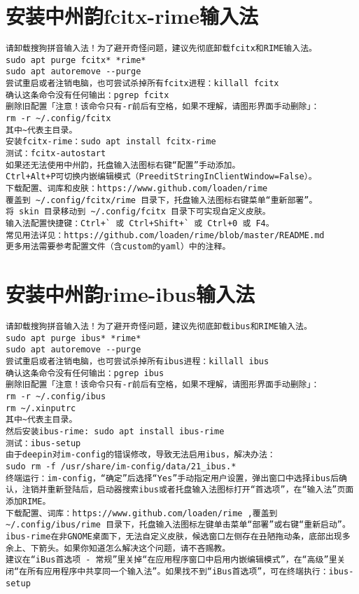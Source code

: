 \documentclass[a4paper,fontset=fandol,zihao=-4,linespread=1.2]{ctexbook}
\begin{document}
\section{安装中州韵fcitx-rime输入法}
\begin{lstlisting}
请卸载搜狗拼音输入法！为了避开奇怪问题，建议先彻底卸载fcitx和RIME输入法。
sudo apt purge fcitx* *rime*
sudo apt autoremove --purge
尝试重启或者注销电脑，也可尝试杀掉所有fcitx进程：killall fcitx
确认这条命令没有任何输出：pgrep fcitx
删除旧配置「注意！该命令只有-r前后有空格，如果不理解，请图形界面手动删除」：
rm -r ~/.config/fcitx
其中~代表主目录。
安装fcitx-rime：sudo apt install fcitx-rime
测试：fcitx-autostart
如果还无法使用中州韵，托盘输入法图标右键“配置”手动添加。
Ctrl+Alt+P可切换内嵌编辑模式（PreeditStringInClientWindow=False）。
下载配置、词库和皮肤：https://www.github.com/loaden/rime
覆盖到 ~/.config/fcitx/rime 目录下，托盘输入法图标右键菜单“重新部署”。
将 skin 目录移动到 ~/.config/fcitx 目录下可实现自定义皮肤。
输入法配置快捷键：Ctrl+` 或 Ctrl+Shift+` 或 Ctrl+0 或 F4。
常见用法详见：https://github.com/loaden/rime/blob/master/README.md
更多用法需要参考配置文件（含custom的yaml）中的注释。
\end{lstlisting}

\section{安装中州韵rime-ibus输入法}
\begin{lstlisting}
请卸载搜狗拼音输入法！为了避开奇怪问题，建议先彻底卸载ibus和RIME输入法。
sudo apt purge ibus* *rime*
sudo apt autoremove --purge
尝试重启或者注销电脑，也可尝试杀掉所有ibus进程：killall ibus
确认这条命令没有任何输出：pgrep ibus
删除旧配置「注意！该命令只有-r前后有空格，如果不理解，请图形界面手动删除」：
rm -r ~/.config/ibus
rm ~/.xinputrc
其中~代表主目录。
然后安装ibus-rime: sudo apt install ibus-rime
测试：ibus-setup
由于deepin对im-config的错误修改，导致无法启用ibus，解决办法：
sudo rm -f /usr/share/im-config/data/21_ibus.*
终端运行：im-config，“确定”后选择“Yes”手动指定用户设置，弹出窗口中选择ibus后确认，注销并重新登陆后，启动器搜索ibus或者托盘输入法图标打开“首选项”，在“输入法”页面添加RIME。
下载配置、词库：https://www.github.com/loaden/rime ,覆盖到 ~/.config/ibus/rime 目录下，托盘输入法图标左键单击菜单“部署”或右键“重新启动”。ibus-rime在非GNOME桌面下，无法自定义皮肤，候选窗口左侧存在丑陋拖动条，底部出现多余上、下箭头。如果你知道怎么解决这个问题，请不吝赐教。
建议在“iBus首选项 - 常规”里关掉“在应用程序窗口中启用内嵌编辑模式”，在“高级”里关闭“在所有应用程序中共享同一个输入法”。如果找不到“iBus首选项”，可在终端执行：ibus-setup
\end{lstlisting}
\end{document}
